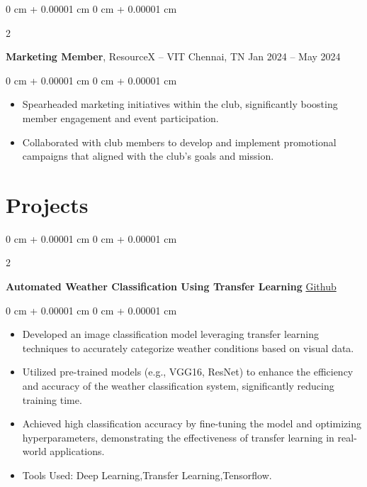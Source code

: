 \documentclass[10pt, letterpaper]{article}
\newenvironment{highlights}{
    \begin{itemize}[
        topsep=0.10 cm,
        parsep=0.10 cm,
        partopsep=0pt,
        itemsep=0pt,
        leftmargin=0 cm + 10pt
    ]
}{
    \end{itemize}
} %
\newenvironment{onecolentry}{
    \begin{adjustwidth}{
        0 cm + 0.00001 cm
    }{
        0 cm + 0.00001 cm
    }
}{
    \end{adjustwidth}
} %
\newenvironment{twocolentry}[2][]{
    \onecolentry
    \def\secondColumn{#2}
    \setcolumnwidth{\fill, 4.5 cm}
    \begin{paracol}{2}
}{
    \switchcolumn \raggedleft \secondColumn
    \end{paracol}
    \endonecolentry
} %
\begin{document}
        \begin{twocolentry}{
            Jan 2024 – May 2024
        }
            \textbf{Marketing Member}, ResourceX -- VIT Chennai, TN\end{twocolentry}

        \vspace{0.10 cm}
         \vspace{0.10 cm}
        \begin{onecolentry}
            \begin{highlights}
                \item Spearheaded marketing initiatives within the club, significantly boosting member engagement and event participation.
                \item Collaborated with club members to develop and implement promotional campaigns that aligned with the club’s goals and mission.
            \end{highlights}
        \end{onecolentry}
        
    \section{Projects}        
        \begin{twocolentry}{
            \href{https://github.com/Itsmepranay/Automated-Weather-Classification-Using-Transfer-Learning}{Github}
        }
            \textbf{Automated Weather Classification Using Transfer Learning}\end{twocolentry}

        \vspace{0.10 cm}
        \begin{onecolentry}
            \begin{highlights}
                \item Developed an image classification model leveraging transfer learning techniques to accurately categorize weather conditions based on visual data.
                \item Utilized pre-trained models (e.g., VGG16, ResNet) to enhance the efficiency and accuracy of the weather classification system, significantly reducing training time.
                \item Achieved high classification accuracy by fine-tuning the model and optimizing hyperparameters, demonstrating the effectiveness of transfer learning in real-world applications.
                \item Tools Used: Deep Learning,Transfer Learning,Tensorflow.
            \end{highlights}
        \end{onecolentry}
\end{document}

